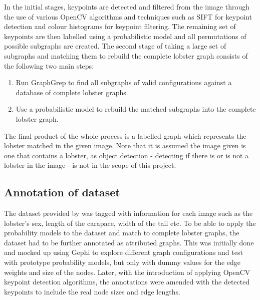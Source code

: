 \noindent
In the initial stages, keypoints are detected and filtered from the image through the use of various OpenCV algorithms and techniques such as SIFT for keypoint detection and colour histograms for keypoint filtering. The remaining set of keypoints are then labelled using a probabilistic model and all permutations of possible subgraphs are created. 
\n
The second stage of taking a large set of subgraphs and matching them to rebuild the complete lobster graph consists of the following two main steps:
\begin{enumerate}
\item Run GraphGrep to find all subgraphs of valid configurations against a database of complete lobster graphs. 
\item Use a probabilistic model to rebuild the matched subgraphs into the complete lobster graph.
\end{enumerate}
The final product of the whole process is a labelled graph which represents the lobster matched in the given image. Note that it is assumed the image given is one that contains a lobster, as object detection - detecting if there is or is not a lobster in the image - is not in the scope of this project.


\subsection{Annotation of dataset}\label{sec:annotation}
The dataset provided by \cite{lobster-thesis} was tagged with information for each image such as the lobster's sex, length of the carapace, width of the tail etc. To be able to apply the probability models to the dataset and match to complete lobster graphs, the dataset had to be further annotated as attributed graphs. This was initially done and mocked up using Gephi to explore different graph configurations and test with prototype probability models, but only with dummy values for the edge weights and size of the nodes. Later, with the introduction of applying OpenCV keypoint detection algorithms, the annotations were amended with the detected keypoints to include the real node sizes and edge lengths.

